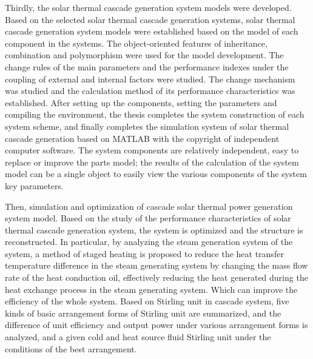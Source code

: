 {Thirdly, the solar thermal cascade generation system models were developed. Based on the selected solar thermal cascade generation systems, solar thermal cascade generation system models were established based on the model of each component in the systems. The object-oriented features of inheritance, combination and polymorphism were used for the model development. The change rules of the main parameters and the performance indexes under the coupling of external and internal factors were studied. The change mechanism was studied and the calculation method of its performance characteristics was established. After setting up the components, setting the parameters and compiling the environment, the thesis completes the system construction of each system scheme, and finally completes the simulation system of solar thermal cascade generation based on MATLAB with the copyright of independent computer software. The system components are relatively independent, easy to replace or improve the parts model; the results of the calculation of the system model can be a single object to easily view the various components of the system key parameters.

Then, simulation and optimization of cascade solar thermal power generation system model. Based on the study of the performance characteristics of solar thermal cascade generation system, the system is optimized and the structure is reconstructed. In particular, by analyzing the steam generation system of the system, a method of staged heating is proposed to reduce the heat transfer temperature difference in the steam generating system by changing the mass flow rate of the heat conduction oil, effectively reducing the heat generated during the heat exchange process in the steam generating system. Which can improve the efficiency of the whole system. Based on Stirling unit in cascade system, five kinds of basic arrangement forms of Stirling unit are summarized, and the difference of unit efficiency and output power under various arrangement forms is analyzed, and a given cold and heat source fluid Stirling unit under the conditions of the best arrangement.

}
